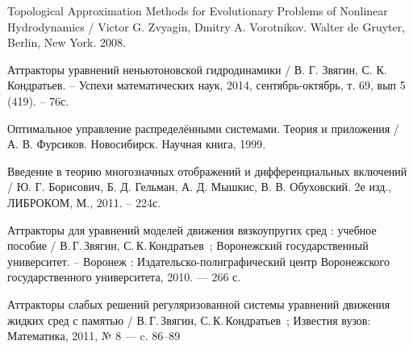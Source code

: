 \begin{thebibliography}{99}

 Topological Approximation Methods for Evolutionary Problems of Nonlinear Hydrodynamics / Victor G. Zvyagin, Dmitry A. Vorotnikov. Walter de Gruyter, Berlin, New York. 2008.

 Аттракторы уравнений неньютоновской гидродинамики / В. Г. Звягин, С. К. Кондратьев. – Успехи математических наук, 2014, сентябрь-октябрь, т. 69, вып 5 (419). – 76с.

 Оптимальное управление распределёнными системами. Теория и приложения / А. В. Фурсиков. Новосибирск. Научная книга, 1999.

 Введение в теорию многозначных отображений и дифференциальных включений / Ю. Г. Борисович, Б. Д. Гельман, А. Д. Мышкис, В. В. Обуховский.  2е изд., ЛИБРОКОМ, М., 2011. – 224с.

 Аттракторы для уравнений моделей движения вязкоупругих сред : учебное пособие / В.\,Г.\,Звягин, С.\,К.\,Кондратьев~; Воронежский государственный университет. -- Воронеж : Издательско-полиграфический центр Воронежского государственного университета, 2010. --- 266 с.

 Аттракторы слабых решений регуляризованной системы уравнений движения жидких сред с памятью / В.\,Г.\,Звягин, С.\,К.\,Кондратьев~; Известия вузов: Математика, 2011, № 8 --- c. 86–89

\end{thebibliography}


